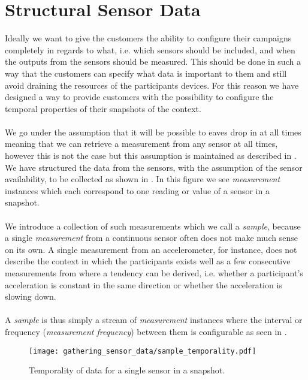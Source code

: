 \section{Structural Sensor Data}
\label{sec:structural_sensor_data}

Ideally we want to give the customers the ability to configure their campaigns completely in regards to what, i.e. which sensors should be included, and when the outputs from the sensors should be measured. This should be done in such a way that the customers can specify what data is important to them and still avoid draining the resources of the participants devices. For this reason we have designed a way to provide customers with the possibility to configure the temporal properties of their snapshots of the context. 
\\\\
We go under the assumption that it will be possible to eaves drop in at all times meaning that we can retrieve a measurement from any sensor at all times, however this is not the case but this assumption is maintained as described in . We have structured the data from the sensors, with the assumption of the sensor availability, to be collected as shown in . In this figure we see \emph{measurement} instances which each correspond to one reading or value of a sensor in a snapshot. 
\\\\
We introduce a collection of such measurements which we call a \emph{sample}, because a single \emph{measurement} from a continuous sensor often does not make much sense on its own. A single measurement from an accelerometer, for instance, does not describe the context in which the participants exists well as a few consecutive measurements from where a tendency can be derived, i.e. whether a participant's acceleration is constant in the same direction or whether the acceleration is slowing down.
\\\\
A \emph{sample} is thus simply a stream of \emph{measurement} instances where the interval or frequency (\emph{measurement frequency}) between them is configurable as seen in .

\begin{figure}[!htbp]
    \centering
    \texttt{[image: gathering\_sensor\_data/sample\_temporality.pdf]}
    \caption{Temporality of data for a single sensor in a snapshot.}
    \label{fig:sample_temporality}
\end{figure}
\FloatBarrier

